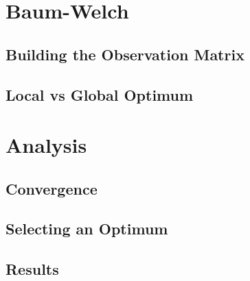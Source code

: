 
\section{Baum-Welch}
\label{Simple_Rainfall_HMM:Baum_Welch}

    \subsection{Building the Observation Matrix}
    \label{Simple_Rainfall_HMM:Baum_Welch:Building_the_Observation_Matrix}

    \subsection{Local vs Global Optimum}
    \label{Simple_Rainfall_HMM:Baum_Welch:Local_vs_Global_Optimum}

\section{Analysis}
\label{Simple_Rainfall_HMM:Analysis}

    \subsection{Convergence}
    \label{Simple_Rainfall_HMM:Analysis:Convergence}

    \subsection{Selecting an Optimum}
    \label{Simple_Rainfall_HMM:Analysis:Selecting_an_Optimum}

    \subsection{Results}
    \label{Simple_Rainfall_HMM:Analysis:Resutls}

    
